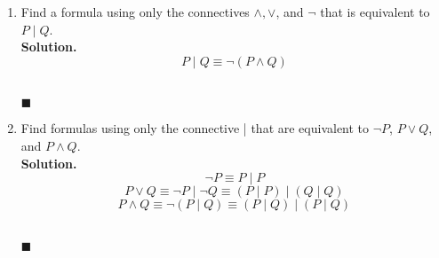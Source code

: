 \documentclass{report}
\newcommand{\sol}{\vspace{1em}\\\textbf{Solution.}\vspace{0.5em}}
\newcommand{\qed}{\ \\\strut\hfill$\blacksquare$\vspace{1em}}
\begin{document}
\begin{enumerate}[leftmargin=*]
\begin{enumerate}
              \item Find a formula using only the connectives $\wedge, \vee$, and $\neg$ that is
                    equivalent to $P \mid Q$. \sol{}
                    \[
                        P \mid Q \equiv \neg(P \wedge Q)
                    \] \qed

              \item Find formulas using only the connective | that are equivalent to $\neg P$, $P
                        \vee Q$, and $P \wedge Q$.\sol{}
                    \[
                        \neg P \equiv P \mid P
                    \]
                    \[
                        P \vee Q \equiv \neg P \mid \neg Q \equiv (P \mid P) \mid (Q \mid Q)
                    \]
                    \[
                        P \wedge Q \equiv \neg(P \mid Q) \equiv (P \mid Q) \mid (P \mid Q)
                    \] \qed
          \end{enumerate}


\end{enumerate}
\end{document}

